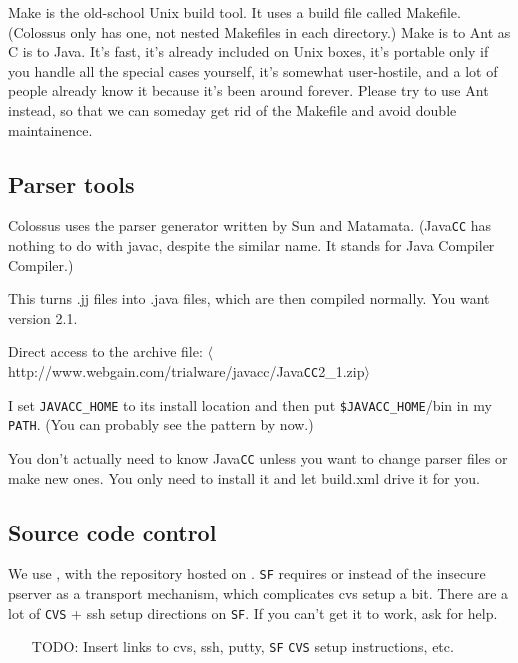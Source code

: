 \documentclass{article}
\begin{document}
Make is the old-school Unix build tool.  It uses a build file called
Makefile.  (Colossus only has one, not nested Makefiles in each
directory.)  Make is to Ant as C is to Java.  It's fast, it's already
included on Unix boxes, it's portable only if you handle all the special
cases yourself, it's somewhat user-hostile, and a lot of people already 
know it because it's been around forever.  Please try to use Ant instead, 
so that we can someday get rid of the Makefile and avoid double 
maintainence.

\subsection{Parser tools}

Colossus uses the  parser generator written by Sun and Matamata.  
(Java\texttt{CC} has nothing to do with javac, despite the similar name.  It
stands for Java Compiler Compiler.)

This turns .jj files into .java files, which are then compiled normally.  
You want version 2.1.

Direct access to the archive file: $\langle$http://www.webgain.com/trialware/javacc/Java\texttt{CC}2\_1.zip$\rangle$

I set \texttt{JAVACC\_HOME} to its install location and then put \texttt{\$JAVACC\_HOME}/bin
in my \texttt{PATH}.  (You can probably see the pattern by now.)

You don't actually need to know Java\texttt{CC} unless you want to change parser
files or make new ones.  You only need to install it and let build.xml
drive it for you.

\subsection{Source code control}

We use , with the repository hosted on .
\texttt{SF} requires  or
  instead of the insecure pserver as a transport mechanism,
which complicates cvs setup a bit.  There are a lot of \texttt{CVS} +
ssh setup directions on \texttt{SF}.  If you can't get it to work,
ask for help.

\begin{itemize}
\item[TODO:]  Insert links to cvs, ssh, putty, \texttt{SF} \texttt{CVS} setup instructions, etc.
\end{itemize}
\end{document}
